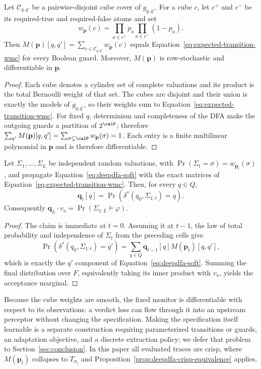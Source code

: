 \begin{proposition}
\label{prop:deepdfa-exact-wmc}
Let $\mathcal C_{q,q'}$ be a pairwise-disjoint cube cover of $g_{q,q'}$. For a cube $c$, let $c^+$ and $c^-$ be its required-true and required-false atoms and set
\[
  w_{\mathbf p}(c)=\prod_{a\in c^+}p_a\prod_{a\in c^-}(1-p_a).
\]
Then $M(\mathbf p)[q,q']=\sum_{c\in\mathcal C_{q,q'}}w_{\mathbf p}(c)$ equals Equation~\eqref{eq:expected-transition-wmc} for every Boolean guard. Moreover, $M(\mathbf p)$ is row-stochastic and differentiable in $\mathbf p$.
\end{proposition}

\begin{proof}
Each cube denotes a cylinder set of complete valuations and its product is the total Bernoulli weight of that set. The cubes are disjoint and their union is exactly the models of $g_{q,q'}$, so their weights sum to Equation~\eqref{eq:expected-transition-wmc}. For fixed $q$, determinism and completeness of the DFA make the outgoing guards a partition of $2^{\calP}$; therefore $\sum_{q'}M(\mathbf p)[q,q']=\sum_{\sigma\subseteq\calP}w_{\mathbf p}(\sigma)=1$. Each entry is a finite multilinear polynomial in $\mathbf p$ and is therefore differentiable.
\end{proof}

\begin{proposition}
\label{prop:deepdfa-trace-marginal}
Let $\Sigma_1,\ldots,\Sigma_L$ be independent random valuations, with $\Pr(\Sigma_t=\sigma)=w_{\mathbf p_t}(\sigma)$, and propagate Equation~\eqref{eq:deepdfa-soft} with the exact matrices of Equation~\eqref{eq:expected-transition-wmc}. Then, for every $q\in Q$,
\[
  \mathbf q_t[q]
  =\Pr\!\left(\delta^*(q_0,\Sigma_{1:t})=q\right).
\]
Consequently $\mathbf q_L\cdot v_o=\Pr(\Sigma_{1:L}\models\varphi)$.
\end{proposition}

\begin{proof}
The claim is immediate at $t=0$. Assuming it at $t-1$, the law of total probability and independence of $\Sigma_t$ from the preceding cells give
\[
  \Pr(\delta^*(q_0,\Sigma_{1:t})=q')
  =\sum_{q\in Q}\mathbf q_{t-1}[q]M(\mathbf p_t)[q,q'],
\]
which is exactly the $q'$ component of Equation~\eqref{eq:deepdfa-soft}. Summing the final distribution over $F$, equivalently taking its inner product with $v_o$, yields the acceptance marginal.
\end{proof}

Because the cube weights are smooth, the fixed monitor is differentiable with respect to its observations: a verdict loss can flow through it into an upstream perceptor without changing the specification. Making the specification itself learnable is a separate construction requiring parameterized transitions or guards, an adaptation objective, and a discrete extraction policy; we defer that problem to Section~\ref{sec:conclusion}. In this paper all evaluated traces are crisp, where $M(\mathbf p_t)$ collapses to $T_{\sigma_t}$ and Proposition~\ref{prop:deepdfa-crisp-equivalence} applies.

